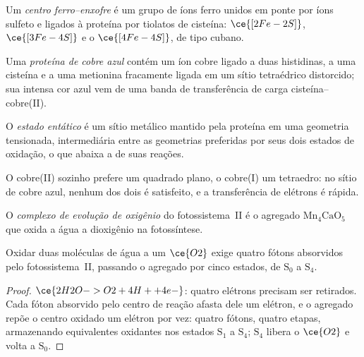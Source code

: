 \begin{definition}\label{def:b3:bioinorganic:fes}
Um \emph{centro ferro--enxofre} é um grupo de íons
ferro unidos em ponte por íons sulfeto e ligados à proteína por tiolatos de cisteína:
$\ce{[2Fe-2S]}$, $\ce{[3Fe-4S]}$ e o $\ce{[4Fe-4S]}$, de tipo cubano.
\end{definition}

\begin{definition}\label{def:b3:bioinorganic:blue-copper}
Uma \emph{proteína de cobre azul} contém um íon
cobre ligado a duas histidinas, a uma cisteína e a uma metionina fracamente ligada em um
sítio tetraédrico distorcido; sua intensa cor azul vem de uma
banda de transferência de carga cisteína--cobre(II).
\end{definition}

\begin{definition}\label{def:b3:bioinorganic:entatic}
O \emph{estado entático} é um sítio metálico mantido pela
proteína em uma geometria tensionada, intermediária entre as geometrias preferidas por seus dois
estados de oxidação, o que abaixa a  de suas reações.
\end{definition}

O cobre(II) sozinho prefere um quadrado plano, o cobre(I) um tetraedro: no sítio de cobre
azul, nenhum dos dois é satisfeito, e a transferência de elétrons é rápida.

\begin{definition}\label{def:b3:bioinorganic:oec}
O \emph{complexo de evolução de oxigênio} do
fotossistema~II é o agregado $\mathrm{Mn_4CaO_5}$ que oxida a água a dioxigênio na
fotossíntese.
\end{definition}

\begin{proposition}\label{prop:b3:bioinorganic:kok}
Oxidar duas moléculas de água a um $\ce{O2}$ exige quatro fótons absorvidos pelo
fotossistema~II, passando o agregado por cinco estados, de $\mathrm S_0$ a $\mathrm S_4$.
\end{proposition}

\begin{proof}
$\ce{2H2O -> O2 + 4H+ + 4e-}$: quatro elétrons precisam ser retirados. Cada fóton absorvido pelo
centro de reação afasta dele um elétron, e o agregado repõe o centro
oxidado um elétron por vez: quatro fótons, quatro etapas, armazenando
equivalentes oxidantes nos estados $\mathrm S_1$ a $\mathrm S_4$; $\mathrm S_4$ libera o $\ce{O2}$ e volta a $\mathrm S_0$.
\end{proof}

